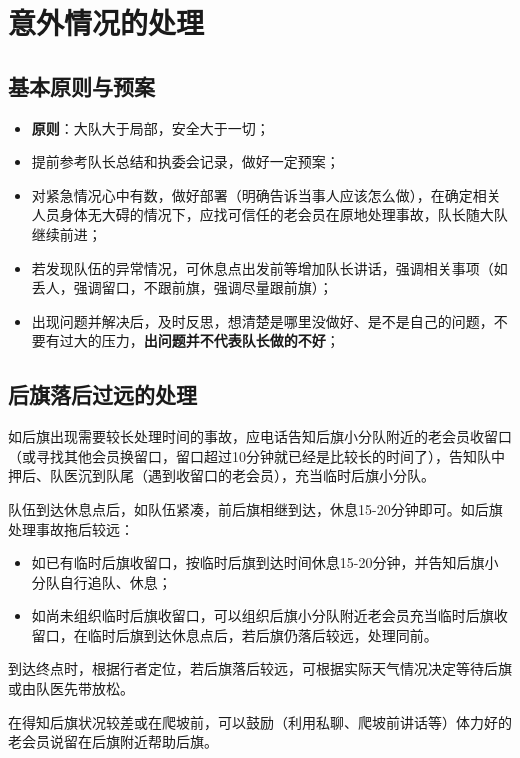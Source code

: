 \documentclass[UTF8]{ctexart}
\begin{document}
\section{意外情况的处理}


\subsection{基本原则与预案}
\begin{itemize}[nosep,left=2em]
    \item \textbf{原则}：大队大于局部，安全大于一切；
    \item 提前参考队长总结和执委会记录，做好一定预案；
    \item 对紧急情况心中有数，做好部署（明确告诉当事人应该怎么做），在确定相关人员身体无大碍的情况下，应找可信任的老会员在原地处理事故，队长随大队继续前进；
    \item 若发现队伍的异常情况，可休息点出发前等增加队长讲话，强调相关事项（如丢人，强调留口，不跟前旗，强调尽量跟前旗）；
    \item 出现问题并解决后，及时反思，想清楚是哪里没做好、是不是自己的问题，不要有过大的压力，\textbf{出问题并不代表队长做的不好}；
\end{itemize}

\subsection{后旗落后过远的处理}

如后旗出现需要较长处理时间的事故，应电话告知后旗小分队附近的老会员收留口（或寻找其他会员换留口，留口超过10分钟就已经是比较长的时间了），告知队中押后、队医沉到队尾（遇到收留口的老会员），充当临时后旗小分队。

队伍到达休息点后，如队伍紧凑，前后旗相继到达，休息15-20分钟即可。如后旗处理事故拖后较远：
\begin{itemize}[nosep,left=2em]
    \item 如已有临时后旗收留口，按临时后旗到达时间休息15-20分钟，并告知后旗小分队自行追队、休息；
    \item 如尚未组织临时后旗收留口，可以组织后旗小分队附近老会员充当临时后旗收留口，在临时后旗到达休息点后，若后旗仍落后较远，处理同前。
\end{itemize}

到达终点时，根据行者定位，若后旗落后较远，可根据实际天气情况决定等待后旗或由队医先带放松。

在得知后旗状况较差或在爬坡前，可以鼓励（利用私聊、爬坡前讲话等）体力好的老会员说留在后旗附近帮助后旗。
\end{document}
